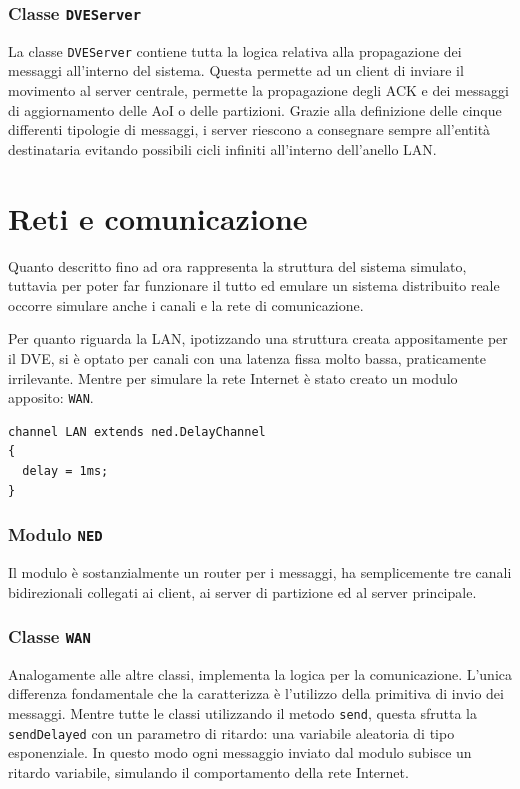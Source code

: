 \documentclass[a4paper, 11pt, oneside]{book}
\theoremstyle{definition}
\theoremstyle{remark}
\begin{document}
\subsubsection{Classe \texttt{DVEServer}}
La classe \texttt{DVEServer} contiene tutta la logica relativa alla propagazione
dei messaggi all'interno del sistema. Questa permette ad un client di inviare
il movimento al server centrale, permette la propagazione degli ACK e dei
messaggi di aggiornamento delle AoI o delle partizioni.
Grazie alla definizione delle cinque differenti tipologie di messaggi, i server
riescono a consegnare sempre all'entità destinataria evitando
possibili cicli infiniti all'interno dell'anello LAN.

\section{Reti e comunicazione}
Quanto descritto fino ad ora rappresenta la struttura del sistema simulato,
tuttavia per poter far funzionare il tutto ed emulare un sistema distribuito
reale occorre simulare anche i canali e la rete di comunicazione.

Per quanto riguarda la LAN, ipotizzando una struttura creata appositamente
per il DVE, si è optato per canali con una latenza fissa molto bassa,
praticamente irrilevante. Mentre per simulare la rete Internet è stato creato
un modulo apposito: \texttt{WAN}.
\begin{lstlisting}
channel LAN extends ned.DelayChannel
{
  delay = 1ms;
}
\end{lstlisting}

\subsubsection{Modulo \texttt{NED}}
Il modulo è sostanzialmente un router per i messaggi, ha semplicemente tre
canali bidirezionali collegati ai client, ai server di partizione ed al server
principale.
\subsubsection{Classe \texttt{WAN}}
Analogamente alle altre classi, implementa la logica per la comunicazione.
L'unica differenza fondamentale che la caratterizza è l'utilizzo della
primitiva di invio dei messaggi. Mentre tutte le classi utilizzando il metodo
\texttt{send}, questa sfrutta la \texttt{sendDelayed} con un parametro
di ritardo: una variabile aleatoria di tipo esponenziale.
In questo modo ogni messaggio inviato dal
modulo subisce un ritardo variabile, simulando il comportamento della rete
Internet.
\end{document}
